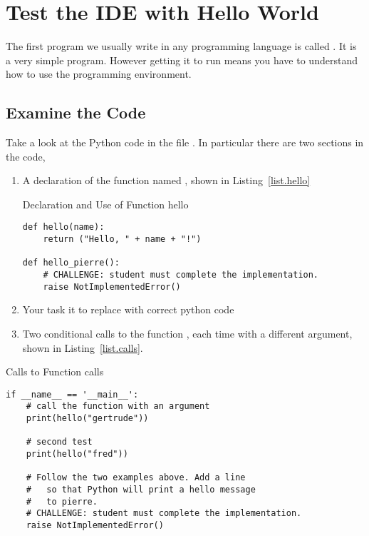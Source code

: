 \section{Test the IDE with Hello World}
\label{sec.hello.world}

The first program we usually write in any programming language is
called .  It is a very simple program.  However
getting it to run means you have to understand how to use the
programming environment.

\subsection{Examine the Code}
\label{sec.examine.the.code}
Take a look at the Python code in the file .  In
particular there are two sections in the code,
\begin{enumerate}
\item A declaration of the function named , shown in
  Listing~\ref{list.hello}

\begin{listing}{Declaration and Use of Function }{hello}
\begin{minipage}[c]{0.95\textwidth}\begin{lstlisting}
def hello(name):
    return ("Hello, " + name + "!")

def hello_pierre():
    # CHALLENGE: student must complete the implementation.
    raise NotImplementedError()
\end{lstlisting}\end{minipage}\end{listing}

\item Your task it to replace  with correct python code 
\item Two conditional calls to the function , each time
  with a different argument, shown in Listing~\ref{list.calls}.
\end{enumerate}

\begin{listing}{Calls to Function }{calls}
\begin{minipage}[c]{0.95\textwidth}\begin{lstlisting}
if __name__ == '__main__':
    # call the function with an argument
    print(hello("gertrude"))
    
    # second test
    print(hello("fred"))

    # Follow the two examples above. Add a line
    #   so that Python will print a hello message 
    #   to pierre.
    # CHALLENGE: student must complete the implementation.
    raise NotImplementedError()
\end{lstlisting}\end{minipage}\end{listing}


